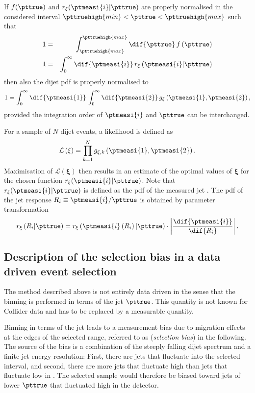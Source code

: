 If $f(\pttrue)$ and $r_{\mathbf{\xi}}(\ptmeasi{i}|\pttrue)$ are properly normalised in the considered interval \mbox{$\pttruehigh{min} < \pttrue < \pttruehigh{max}$} such that
\begin{eqnarray*}
  1 & = & \int^{\pttruehigh{max}}_{\pttruehigh{max}}\dif{\pttrue}\,f\left(\pttrue\right) \\
  1 & = & \int^{\infty}_{0}\dif{\ptmeasi{i}}\,r_{\mathbf{\xi}}\left(\ptmeasi{i}|\pttrue\right)
\end{eqnarray*}
then also the dijet pdf is properly normalised to
\begin{equation*}
  1 = \int^{\infty}_{0}\dif{\ptmeasi{1}}\,\int^{\infty}_{0}\dif{\ptmeasi{2}}\, g_{\mathbf{\xi}}\left(\ptmeasi{1},\ptmeasi{2}\right),
\end{equation*}
provided the integration order of $\ptmeasi{i}$ and $\pttrue$ can be interchanged.

For a sample of $N$ dijet events, a likelihood is defined as
\begin{equation}
  \label{eq:ResFit:Likelihood}
  \mathcal{L}\left(\mathbf{\xi}\right) = \prod^{N}_{k=1} g_{\mathbf{\xi},k}\left(\ptmeasi{1},\ptmeasi{2}\right).
\end{equation}
Maximisation of $\mathcal{L}(\mathbf{\xi})$ then results in an
estimate of the optimal values of $\mathbf{\xi}$ for the chosen
function $r_{\mathbf{\xi}}(\ptmeasi{i}|\pttrue)$.
Note that $r_{\mathbf{\xi}}(\ptmeasi{i}|\pttrue)$ is defined as the
pdf of the measured jet \pt.
The pdf of the jet \pt response \mbox{$R_{i}\equiv\ptmeasi{i} / \pttrue$} is obtained by parameter transformation
\begin{equation*}
  r_{\mathbf{\xi}}\left(R_{i}|\pttrue\right) =
  r_{\mathbf{\xi}}\left(\ptmeasi{i}\left(R_{i}\right)|\pttrue\right)\cdot\left|\frac{\dif{\ptmeasi{i}}}{\dif{R_{i}}}\right|.
\end{equation*}



\subsection{Description of the selection bias in a data driven event selection}\label{sec:ResFit:Method:Biases}

The method described above is not entirely data driven in the sense that the binning is performed in terms
of the jet $\pttrue$.
This quantity is not known for Collider data and has to be replaced by a measurable quantity. 

Binning in terms of the jet \ptmeas leads to a measurement bias due to migration effects at the edges of 
the selected \pt range, referred to as (\textit{selection bias}) in the following.
The source of the bias is a combination of the steeply falling dijet \pt spectrum and a finite jet energy resolution:
First, there are jets that fluctuate into the selected \pt interval, and second, there are more jets that fluctuate high than jets that fluctuate low in \pt.
The selected sample would therefore be biased toward jets of lower $\pttrue$ that fluctuated high in the detector.

